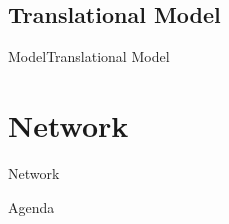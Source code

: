\subsection{Translational Model}
\begin{frame}{Model}{Translational Model}

\end{frame}

\section{Network}
\begin{frame}{Network}{}

\end{frame}

\begin{frame}{Agenda}{}
    \tableofcontents
\end{frame}

